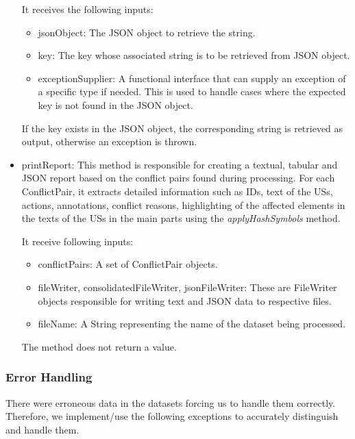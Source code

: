 \begin{itemize}
	It receives the following inputs:
	\begin{itemize}
		\item jsonObject: The JSON object to retrieve the string.
		
		\item key: The key whose associated string is to be retrieved from JSON object.
		
		\item exceptionSupplier: A functional interface that can supply an exception of a specific type if needed. This is used to handle cases where the expected key is not found in the JSON object.
		
	\end{itemize}
	If the key exists in the JSON object, the corresponding string is retrieved as output, otherwise an exception is thrown.
	
	\item printReport: This method is responsible for creating a textual, tabular and JSON report based on the conflict pairs found during processing. For each ConflictPair, it extracts detailed information such as IDs, text of the USs, actions, annotations, conflict reasons, highlighting of the affected elements in the texts of the USs in the main parts using the \textit{applyHashSymbols} method. 
	
	It receive following inputs: 
	\begin{itemize}
		\item conflictPairs: A set of ConflictPair objects.
		
		\item fileWriter, consolidatedFileWriter, jsonFileWriter: These are FileWriter objects responsible for writing text and JSON data to respective files.
		
		\item fileName: A String representing the name of the dataset being processed.
	\end{itemize}
	The method does not return a value.
	\end{itemize}	
\subsubsection*{Error Handling}
There were erroneous data in the datasets forcing us to handle them correctly. Therefore, we implement/use the following exceptions to accurately distinguish and handle them.

